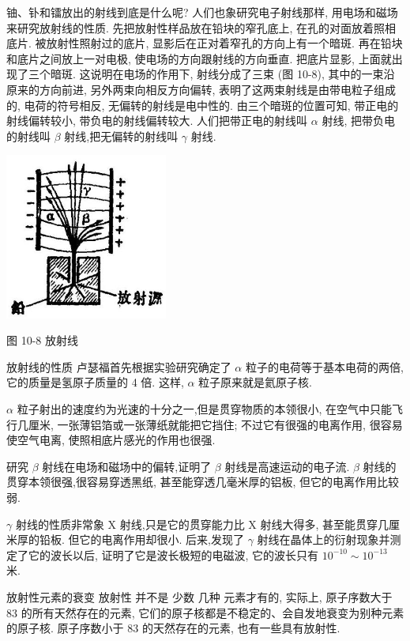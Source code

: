 \documentclass[10pt]{article}
\begin{document}
铀、钋和镭放出的射线到底是什么呢? 人们也象研究电子射线那样, 用电场和磁场来研究放射线的性质. 先把放射性样品放在铅块的窄孔底上, 在孔的对面放着照相底片. 被放射性照射过的底片, 显影后在正对着窄孔的方向上有一个暗斑. 再在铅块和底片之间放上一对电极, 使电场的方向跟射线的方向垂直. 把底片显影, 上面就出现了三个暗斑. 这说明在电场的作用下, 射线分成了三束 (图 10-8), 其中的一束沿原来的方向前进, 另外两束向相反方向偏转, 表明了这两束射线是由带电粒子组成的, 电荷的符号相反, 无偏转的射线是电中性的. 由三个暗斑的位置可知, 带正电的射线偏转较小, 带负电的射线偏转较大. 人们把带正电的射线叫 \(\alpha\) 射线, 把带负电的射线叫 \(\beta\) 射线,把无偏转的射线叫 \(\gamma\) 射线.

\begin{center}
\includegraphics[max width=0.4\textwidth]{images/01913056-1f15-74d8-9184-9aab52c9d66b_341_784911.jpg}
\end{center}

图 10-8 放射线

放射线的性质 卢瑟福首先根据实验研究确定了 \(\alpha\) 粒子的电荷等于基本电荷的两倍, 它的质量是氢原子质量的 4 倍. 这样, \(\alpha\) 粒子原来就是氦原子核.

\(\alpha\) 粒子射出的速度约为光速的十分之一,但是贯穿物质的本领很小, 在空气中只能飞行几厘米, 一张薄铝箔或一张薄纸就能把它挡住; 不过它有很强的电离作用, 很容易使空气电离, 使照相底片感光的作用也很强.

研究 \(\beta\) 射线在电场和磁场中的偏转,证明了 \(\beta\) 射线是高速运动的电子流. \(\beta\) 射线的贯穿本领很强,很容易穿透黑纸, 甚至能穿透几毫米厚的铝板, 但它的电离作用比较弱.

\(\gamma\) 射线的性质非常象 \(\mathrm{X}\) 射线,只是它的贯穿能力比 \(\mathrm{X}\) 射线大得多, 甚至能贯穿几厘米厚的铅板. 但它的电离作用却很小. 后来,发现了 \(\gamma\) 射线在晶体上的衍射现象并测定了它的波长以后, 证明了它是波长极短的电磁波, 它的波长只有 \({10}^{-{10}} \sim {10}^{-{13}}\) 米.

放射性元素的衰变 放射性 并不是 少数 几种 元素才有的, 实际上, 原子序数大于 83 的所有天然存在的元素, 它们的原子核都是不稳定的、会自发地衰变为别种元素的原子核. 原子序数小于 83 的天然存在的元素, 也有一些具有放射性.
\end{document}
